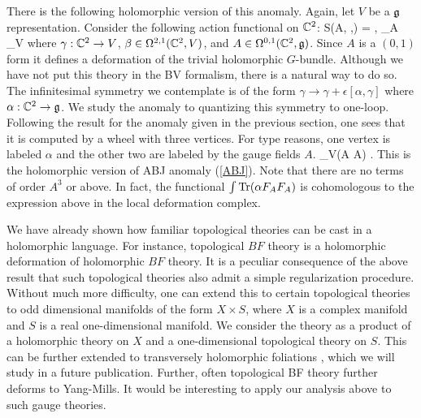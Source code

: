 \documentclass[10pt]{amsart}
\begin{document}
There is the following holomorphic version of this anomaly. 
Again, let $V$ be a $\mathfrak g$ representation.
Consider the following action functional on $\mathbb C^2$:
\ben
S(A, \beta,\gamma) = \int \<\beta, \dbar_A \gamma\>_V
\een
where $\gamma : \mathbb C^2 \to V$, $\beta \in \Omega^{2,1}(\mathbb C^2 , V)$, and $A \in \Omega^{0,1}(\mathbb C^2, \mathfrak g)$. 
Since $A$ is a $(0,1)$ form it defines a deformation of the trivial holomorphic $G$-bundle. 
Although we have not put this theory in the BV formalism, there is a natural way to do so. 
The infinitesimal symmetry we contemplate is of the form $\gamma \to \gamma + \epsilon [\alpha, \gamma]$ where $\alpha : \mathbb C^2 \to \mathfrak g$. 
We study the anomaly to quantizing this symmetry to one-loop.
Following the result for the anomaly given in the previous section, one sees that it is computed by a wheel with three vertices. 
For type reasons, one vertex is labeled $\alpha$ and the other two are labeled by the gauge fields $A$.
\ben
{}_V(\alpha \partial A \partial A) .
\een
This is the holomorphic version of ABJ anomaly (\ref{ABJ}). 
Note that there are no terms of order $A^3$ or above. 
In fact, the functional $\int {\rm Tr}(\alpha F_A F_A)$ is cohomologous to the expression above in the local deformation complex.


\begin{rmk} 
We have already shown how familiar topological theories can be cast in a holomorphic language.
For instance, topological $BF$ theory is a holomorphic deformation of holomorphic $BF$ theory. 
It is a peculiar consequence of the above result that such topological theories also admit a simple regularization procedure. 
Without much more difficulty, one can extend this to certain topological theories to odd dimensional manifolds of the form $X \times S$, where $X$ is a complex manifold and $S$ is a real one-dimensional manifold. 
We consider the theory as a product of a holomorphic theory on $X$ and a one-dimensional topological theory on $S$. 
This can be further extended to transversely holomorphic foliations \cite{THF1,THF2}, which we will study in a future publication.
Further, often topological BF theory further deforms to Yang-Mills.
It would be interesting to apply our analysis above to such gauge theories. 
\end{rmk}
\end{document}

